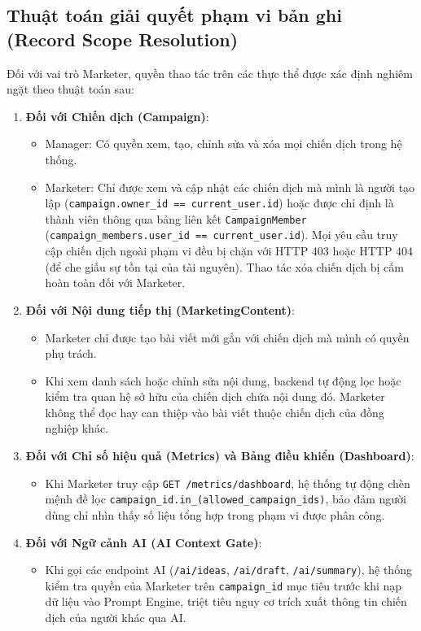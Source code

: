 \subsection{Thuật toán giải quyết phạm vi bản ghi (Record Scope Resolution)}
Đối với vai trò Marketer, quyền thao tác trên các thực thể được xác định nghiêm ngặt theo thuật toán sau:
\begin{enumerate}
  \item \textbf{Đối với Chiến dịch (Campaign)}:
    \begin{itemize}
      \item Manager: Có quyền xem, tạo, chỉnh sửa và xóa mọi chiến dịch trong hệ thống.
      \item Marketer: Chỉ được xem và cập nhật các chiến dịch mà mình là người tạo lập (\texttt{campaign.owner\_id == current\_user.id}) hoặc được chỉ định là thành viên thông qua bảng liên kết \texttt{CampaignMember} (\texttt{campaign\_members.user\_id == current\_user.id}). Mọi yêu cầu truy cập chiến dịch ngoài phạm vi đều bị chặn với HTTP 403 hoặc HTTP 404 (để che giấu sự tồn tại của tài nguyên). Thao tác xóa chiến dịch bị cấm hoàn toàn đối với Marketer.
    \end{itemize}
  \item \textbf{Đối với Nội dung tiếp thị (MarketingContent)}:
    \begin{itemize}
      \item Marketer chỉ được tạo bài viết mới gắn với chiến dịch mà mình có quyền phụ trách.
      \item Khi xem danh sách hoặc chỉnh sửa nội dung, backend tự động lọc hoặc kiểm tra quan hệ sở hữu của chiến dịch chứa nội dung đó. Marketer không thể đọc hay can thiệp vào bài viết thuộc chiến dịch của đồng nghiệp khác.
    \end{itemize}
  \item \textbf{Đối với Chỉ số hiệu quả (Metrics) và Bảng điều khiển (Dashboard)}:
    \begin{itemize}
      \item Khi Marketer truy cập \texttt{GET /metrics/dashboard}, hệ thống tự động chèn mệnh đề lọc \texttt{campaign\_id.in\_(allowed\_campaign\_ids)}, bảo đảm người dùng chỉ nhìn thấy số liệu tổng hợp trong phạm vi được phân công.
    \end{itemize}
  \item \textbf{Đối với Ngữ cảnh AI (AI Context Gate)}:
    \begin{itemize}
      \item Khi gọi các endpoint AI (\texttt{/ai/ideas}, \texttt{/ai/draft}, \texttt{/ai/summary}), hệ thống kiểm tra quyền của Marketer trên \texttt{campaign\_id} mục tiêu trước khi nạp dữ liệu vào Prompt Engine, triệt tiêu nguy cơ trích xuất thông tin chiến dịch của người khác qua AI.
    \end{itemize}
\end{enumerate}

